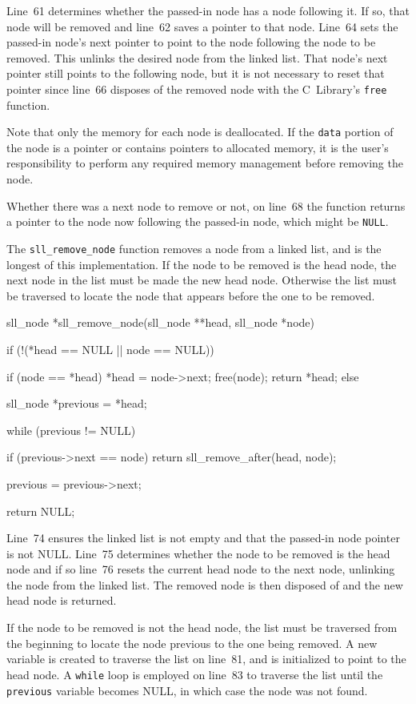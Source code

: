 \documentclass{article}
\begin{document}
  Line~61 determines whether the passed-in node has a node following it. If so, that node will be removed and line~62 saves a pointer to that node. Line~64 sets the passed-in node's next pointer to point to the node following the node to be removed. This unlinks the desired node from the linked list. That node's next pointer still points to the following node, but it is not necessary to reset that pointer since line~66 disposes of the removed node with the C~Library's \verb|free| function.

  Note that only the memory for each node is deallocated. If the \verb|data| portion of the node is a pointer or contains pointers to allocated memory, it is the user's responsibility to perform any required memory management before removing the node.

  Whether there was a next node to remove or not, on line~68 the function returns a pointer to the node now following the passed-in node, which might be \verb|NULL|.

  The \verb|sll_remove_node| function removes a node from a linked list, and is the longest of this implementation. If the node to be removed is the head node, the next node in the list must be made the new head node. Otherwise the list must be traversed to locate the node that appears before the one to be removed.
  \begin{lstc}
sll_node *sll_remove_node(sll_node **head, sll_node *node) {
  if (!(*head == NULL || node == NULL)) {
    if (node == *head) {
        *head = node->next;
        free(node);
        return *head;
    }
    else {
      sll_node *previous = *head;

      while (previous != NULL) {
        if (previous->next == node)
          return sll_remove_after(head, node);

        previous = previous->next;
      }
    }
  }

  return NULL;
}\end{lstc}
  Line~74 ensures the linked list is not empty and that the passed-in node pointer is not NULL. Line~75 determines whether the node to be removed is the head node and if so line~76 resets the current head node to the next node, unlinking the node from the linked list. The removed node is then disposed of and the new head node is returned.

  If the node to be removed is not the head node, the list must be traversed from the beginning to locate the node previous to the one being removed. A new variable is created to traverse the list on line~81, and is initialized to point to the head node. A \verb|while| loop is employed on line~83 to traverse the list until the \verb|previous| variable becomes NULL, in which case the node was not found.
\end{document}
